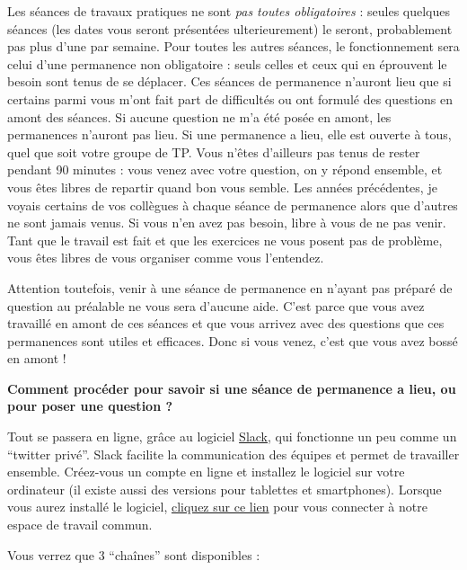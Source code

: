 \documentclass[a4paperpaper,]{article}
\begin{document}
Les séances de travaux pratiques ne sont \emph{pas toutes obligatoires} : seules quelques séances (les dates vous seront présentées ulterieurement) le seront, probablement pas plus d'une par semaine. Pour toutes les autres séances, le fonctionnement sera celui d'une permanence non obligatoire : seuls celles et ceux qui en éprouvent le besoin sont tenus de se déplacer. Ces séances de permanence n'auront lieu que si certains parmi vous m'ont fait part de difficultés ou ont formulé des questions en amont des séances. Si aucune question ne m'a été posée en amont, les permanences n'auront pas lieu. Si une permanence a lieu, elle est ouverte à tous, quel que soit votre groupe de TP. Vous n'êtes d'ailleurs pas tenus de rester pendant 90 minutes : vous venez avec votre question, on y répond ensemble, et vous êtes libres de repartir quand bon vous semble. Les années précédentes, je voyais certains de vos collègues à chaque séance de permanence alors que d'autres ne sont jamais venus. Si vous n'en avez pas besoin, libre à vous de ne pas venir. Tant que le travail est fait et que les exercices ne vous posent pas de problème, vous êtes libres de vous organiser comme vous l'entendez.

Attention toutefois, venir à une séance de permanence en n'ayant pas préparé de question au préalable ne vous sera d'aucune aide. C'est parce que vous avez travaillé en amont de ces séances et que vous arrivez avec des questions que ces permanences sont utiles et efficaces. Donc si vous venez, c'est que vous avez bossé en amont !

\textbf{Comment procéder pour savoir si une séance de permanence a lieu, ou pour poser une question ?}

Tout se passera en ligne, grâce au logiciel \href{https://slack.com/intl/fr-fr/}{Slack}, qui fonctionne un peu comme un ``twitter privé''. Slack facilite la communication des équipes et permet de travailler ensemble. Créez-vous un compte en ligne et installez le logiciel sur votre ordinateur (il existe aussi des versions pour tablettes et smartphones). Lorsque vous aurez installé le logiciel, \href{https://join.slack.com/t/geel-2019/shared_invite/enQtNjkwNTA1Njk1MDcyLTdhNGM3YmM1ODhkZTMwN2Q4YzkyZDMwMzA3OGNjNzIwY2VlNDc2NjUzM2UxYmJlYjQyMjQwZmI2ZGE4YmMxNDk}{cliquez sur ce lien} pour vous connecter à notre espace de travail commun.

Vous verrez que 3 ``chaînes'' sont disponibles :
\end{document}
